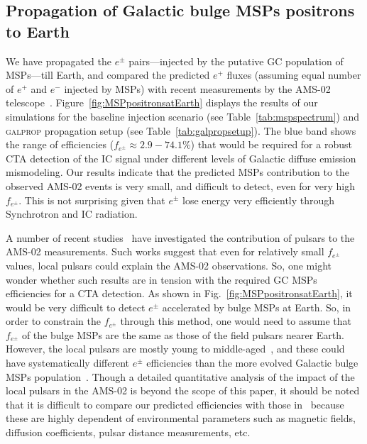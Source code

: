 \documentclass[doublespace,draft,nopageskip]{VTthesis} %
\begin{document}
\begin{appendices}
 
 \section{Propagation of Galactic bulge MSPs positrons to Earth}
 
We have propagated the $e^\pm$ pairs---injected by the putative GC population of MSPs---till Earth, and compared the predicted $e^+$ fluxes (assuming equal number of $e^+$ and $e^-$ injected by MSPs) with recent measurements by the AMS-02 telescope~\citep{Aguilar:2021tos}. Figure~\ref{fig:MSPpositronsatEarth} displays the results of our simulations for the baseline injection scenario (see Table~\ref{tab:mspspectrum}) and \textsc{galprop} propagation setup (see Table~\ref{tab:galpropsetup}). The blue band shows the range of efficiencies ($f_{e^\pm}\approx 2.9-74.1\%$) that would be required for a robust CTA detection of the IC signal under different levels of Galactic diffuse emission mismodeling. Our results indicate that the predicted MSPs contribution to the observed AMS-02 events is very small, and difficult to detect, even for very high $f_{e^\pm}$. This is not surprising given that $e^\pm$ lose energy very efficiently through Synchrotron and IC radiation.

A number of recent studies~\citep[e.g.,][]{Cholis:2018izys, Manconi:2020ipm} have investigated the contribution of pulsars to the AMS-02 measurements. Such works suggest that even for relatively small $f_{e^\pm}$ values, local pulsars could explain the AMS-02 observations. So, one might wonder whether such results are in tension with the required GC MSPs efficiencies for a CTA detection. As shown in Fig.~\ref{fig:MSPpositronsatEarth}, it would be very difficult to detect $e^\pm$ accelerated by bulge MSPs at Earth. So, in order to constrain the $f_{e^\pm}$ through this method, one would need to assume that $f_{e^\pm}$ of the bulge MSPs are the same as those of the field pulsars nearer Earth. However, the local pulsars are mostly young to middle-aged~\citep{Delahaye:2010}, and these could have systematically different $e^\pm$ efficiencies than the more evolved Galactic bulge MSPs population~\citep{Song:2021zrs}. Though a detailed quantitative analysis of the impact of the local pulsars in the AMS-02 is beyond the scope of this paper, it should be noted that it is difficult to compare our predicted efficiencies with those in~\citep[e.g.,][]{Cholis:2018izys, Manconi:2020ipm} because these are highly dependent of environmental parameters such as magnetic fields, diffusion coefficients, pulsar distance measurements, etc.    


\end{appendices}
\end{document}
